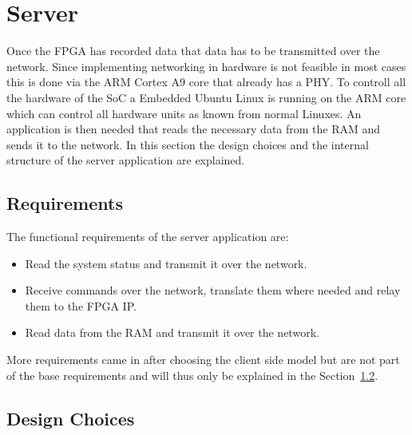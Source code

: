 %
%

\chapter{Server}
\label{ch:server}

Once the FPGA has recorded data that data has to be transmitted over the network. Since implementing networking in hardware is not feasible in most cases this is done via the ARM Cortex A9 core that already has a PHY. To controll all the hardware of the SoC a Embedded Ubuntu Linux is running on the ARM core which can control all hardware units as known from normal Linuxes.
An application is then needed that reads the necessary data from the RAM and sends it to the network. In this section the design choices and the internal structure of the server application are explained.

\section{Requirements}
\label{sec:server:requirements}

The functional requirements of the server application are:

\begin{itemize}
    \item Read the system status and transmit it over the network.
    \item Receive commands over the network, translate them where needed and relay them to the FPGA IP.
    \item Read data from the RAM and transmit it over the network.
\end{itemize}

More requirements came in after choosing the client side model but are not part of the base requirements and will thus only be explained in the Section~\ref{sec:server:design_choices}.

%
%

\section{Design Choices}
\label{sec:server:design_choices}

